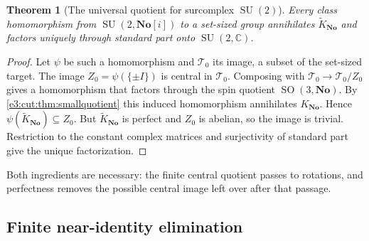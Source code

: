 \documentclass[11pt,letterpaper]{article}
\numberwithin{equation}{section}
\newtheorem{theorem}{Theorem}[section]
\theoremstyle{definition}
\theoremstyle{remark}
\newcommand{\No}{\mathbf{No}}
\newcommand{\C}{\mathbb C}
\newcommand{\SO}{\operatorname{SO}}
\newcommand{\SU}{\operatorname{SU}}
\begin{document}
\begin{theorem}[The universal quotient for surcomplex $\SU(2)$]\label{e3:cut:thm:su2}
Every class homomorphism from $\SU(2,\No[i])$ to a set-sized group annihilates
$\widetilde K_{\No}$ and factors uniquely through standard part onto
$\SU(2,\C)$.
\end{theorem}
\begin{proof}
Let $\psi$ be such a homomorphism and $\mathcal T_0$ its image, a subset of the
set-sized target. The image $Z_0=\psi(\{\pm I\})$ is central in
$\mathcal T_0$. Composing with $\mathcal T_0\to\mathcal T_0/Z_0$ gives a
homomorphism that factors through the spin quotient $\SO(3,\No)$. By
\cref{e3:cut:thm:smallquotient} this induced homomorphism annihilates
$K_{\No}$. Hence $\psi(\widetilde K_{\No})\subseteq Z_0$. But
$\widetilde K_{\No}$ is perfect and $Z_0$ is abelian, so the image is trivial.
Restriction to the constant complex matrices and surjectivity of standard part
give the unique factorization.
\end{proof}

Both ingredients are necessary: the finite central quotient passes to
rotations, and perfectness removes the possible central image left over after
that passage.

\subsection{Finite near-identity elimination}
\end{document}

